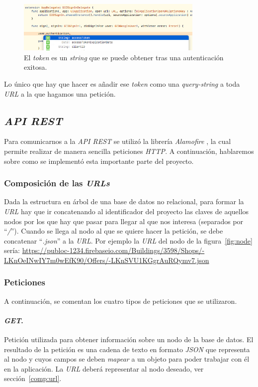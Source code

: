 \begin{figure}[bt]
\centering
\includegraphics[width=0.8\textwidth]{figures/access-token.png}
\caption{El \textit{token} es un \textit{string} que se puede obtener tras una autenticación exitosa.\label{fig:access-token}}
\end{figure}

Lo único que hay que hacer es añadir ese \textit{token} como una \textit{query-string} a toda \textit{URL} a la que hagamos una petición.

\subsection{\textit{API REST}}
Para comunicarnos a la \textit{API REST} se utilizó la librería \textit{Alamofire} \cite{noauthor_alamofire_nodate}, la cual permite realizar de manera sencilla peticiones \textit{HTTP}. A continuación, hablaremos sobre como se implementó esta importante parte del proyecto.

\subsubsection*{Composición de las \textit{URLs}} \label{comp:url}
Dada la estructura en árbol de una base de datos no relacional, para formar la \textit{URL} hay que ir concatenando al identificador del proyecto las claves de aquellos nodos por los que hay que pasar para llegar al que nos interesa (separados por ``\textit{/}''). Cuando se llega al nodo al que se quiere hacer la petición, se debe concatenar ``\textit{.json}'' a la \textit{URL}. Por ejemplo la \textit{URL} del nodo de la figura~\ref{fig:node} sería: \url{https://publoc-1234.firebaseio.com/Buildings/3598/Shops/-LKnOeINwIY7m0wEfK90/Offers/-LKnSVU1KGgrAuRQymv7.json}

\subsubsection*{Peticiones}
A continuación, se comentan los cuatro tipos de peticiones que se utilizaron.

\paragraph{\textit{GET}.} Petición utilizada para obtener información sobre un nodo de la base de datos. El resultado de la petición es una cadena de texto en formato \textit{JSON} que representa al nodo y cuyos campos se deben \textit{mapear} a un objeto para poder trabajar con él en la aplicación. La \textit{URL} deberá representar al nodo deseado, ver sección~\ref{comp:url}.

